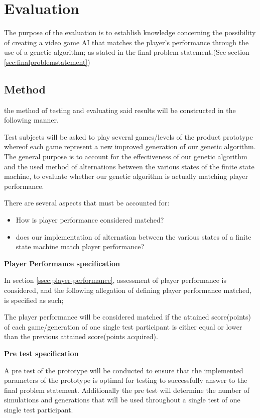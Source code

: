 \section{Evaluation} \label{sec:evaluation}
The purpose of the evaluation is to establish knowledge concerning the possibility of creating a video game AI that matches the player's performance through the use of a genetic algorithm; as stated in the final problem statement.(See section \ref{sec:finalproblemstatement})


\subsection{Method} \label{sec:eval_method}
the method of testing and evaluating said results will be constructed in the following manner.

Test subjects will be asked to play several games/levels of the product prototype whereof each game represent a new improved generation of our genetic algorithm. The general purpose is to account for the effectiveness of our genetic algorithm and the used method of alternations between the various states of the finite state machine, to evaluate whether our genetic algorithm is actually matching player performance.

There are several aspects that must be accounted for:

\begin{itemize}
\item How is player performance considered matched?
\item does our implementation of alternation between the various states of a finite state machine match player performance?
\end{itemize}


\textbf{Player Performance specification}


In section \ref{ssec:player-performance}, assessment of player performance is considered, and the following allegation of defining player performance matched, is specified as such;

The player performance will be considered matched if the attained score(points) of each game/generation of one single test participant is either equal or lower than the previous attained score(points acquired).

\textbf{Pre test specification}


A pre test of the prototype will be conducted to ensure that the implemented parameters of the prototype is optimal for testing to successfully answer to the final problem statement.
Additionally the pre test will determine the number of simulations and generations that will be used throughout a single test of one single test participant.

